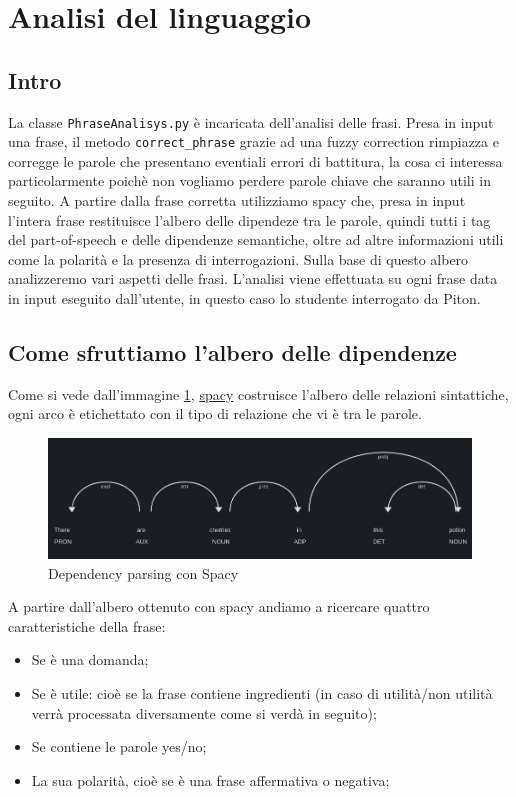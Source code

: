\section{Analisi del linguaggio}
\subsection{Intro}
La classe \texttt{PhraseAnalisys.py} è incaricata dell'analisi delle frasi.
Presa in input una frase, il metodo \texttt{correct\_phrase} grazie ad una fuzzy correction rimpiazza e corregge le parole che presentano eventiali errori di battitura, la cosa ci interessa particolarmente poichè non vogliamo perdere parole chiave che saranno utili in seguito.
A partire dalla frase corretta  utilizziamo spacy che, presa in input l'intera frase restituisce l'albero delle dipendeze tra le parole, quindi tutti i tag del part-of-speech e delle dipendenze semantiche, oltre ad altre informazioni utili come la polarità e la presenza di interrogazioni. Sulla base di questo albero analizzeremo vari aspetti delle frasi. L'analisi viene effettuata su ogni frase data in input eseguito dall'utente, in questo caso lo studente interrogato da Piton.
\subsection{Come sfruttiamo l'albero delle dipendenze}
Come si vede dall'immagine \ref{fig:Spacy}, \href{https://spacy.io/}{spacy} costruisce l'albero delle relazioni sintattiche, ogni arco è etichettato con il tipo di relazione che vi è tra le parole.
\begin{figure}[h]
    \centering
    \includegraphics[scale=0.45]{Images/imgSpacy.png}
    \caption{Dependency parsing con Spacy}
    \label{fig:Spacy}
\end{figure}
A partire dall'albero ottenuto con spacy andiamo a ricercare quattro caratteristiche della frase:
\begin{itemize}
    \item Se è una domanda;
    \item Se è utile: cioè se la frase contiene ingredienti (in caso di utilità/non utilità verrà processata diversamente come si verdà in seguito);
    \item Se contiene le parole yes/no;
    \item La sua polarità, cioè se è una frase affermativa o negativa;
\end{itemize}
